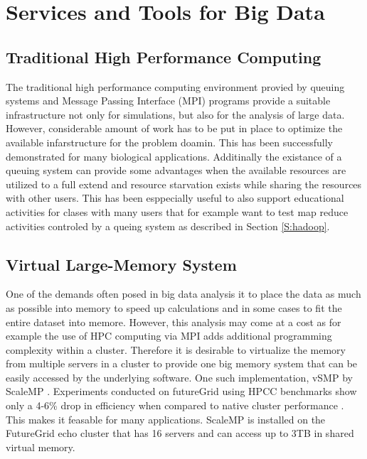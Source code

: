 \section{Services and Tools for Big Data}

\subsection{Traditional High Performance Computing}

The traditional high performance computing environment provied by queuing systems and Message Passing Interface (MPI) programs provide a suitable infrastructure not only for simulations, but also for the analysis of large data. However, considerable amount of work has to be put in place to optimize the available infarstructure for the problem doamin. This has been successfully demonstrated for many biological applications. Additinally the existance of a queuing system can provide some advantages when the available resources are utilized to a full extend and resource starvation exists while sharing the resources with other users. This has been esppecially useful to also support educational activities for clases with many users that for example want to test map reduce activities controled by a queing system as described in Section \ref{S:hadoop}.

\subsection{Virtual Large-Memory System}

One of the demands often posed in big data analysis it to place the data as much as possible into memory to speed up calculations and in some cases to fit the entire dataset into memore. However, this analysis may come at a cost as for example the use of HPC computing via MPI adds additional programming complexity within a cluster. Therefore it is desirable to virtualize the memory from multiple servers in a cluster to provide one big memory system that can be easily accessed by the underlying software. 
One such implementation, vSMP by ScaleMP \cite{www-scalemp}.
Experiments conducted on futureGrid using HPCC
benchmarks show only a 4-6\% drop in efficiency when compared to native
cluster performance \cite{las12fg-bookchapter}. This makes it feasable for many applications. ScaleMP is installed on the FutureGrid echo cluster that has 16 servers and can access up to 3TB in shared virtual memory.

